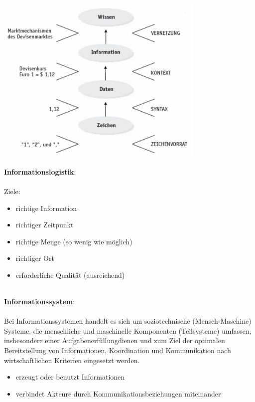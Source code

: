 \documentclass[a4]{scrartcl}
\begin{document}
\ \\

\begin{center}
    \includegraphics[width= 10cm]{digi.jpg}
\end{center}

\textbf{Informationslogistik}: \\ \\
Ziele: \\
\begin{itemize}
    \item richtige Information
    \item richtiger Zeitpunkt
    \item richtige Menge (so wenig wie möglich)
    \item richtiger Ort
    \item erforderliche Qualität (ausreichend)
\end{itemize}
\ \\
\textbf{Informationssystem}: \\
\\
Bei Informationssystemen handelt es sich um soziotechnische (Mensch-Maschine) Systeme, die menschliche und maschinelle Komponenten (Teilsysteme) umfassen, insbesondere einer Aufgabenerfüllungdienen und zum Ziel der optimalen Bereitstellung von Informationen, Koordination und Kommunikation nach wirtschaftlichen Kriterien eingesetzt werden.

\begin{itemize}
    \item erzeugt oder benutzt Informationen
    \item verbindet Akteure durch Kommunikationsbeziehungen miteinander
\end{itemize}
\end{document}
